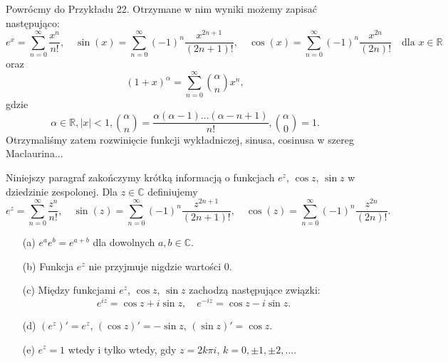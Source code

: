 \documentclass[leqno]{article}
\begin{document}
\begin{justify}
\begin{ex}
    Powrócmy do Przykładu 22. Otrzymane w nim wyniki możemy zapisać następująco:
    \[
        e^x = \sum_{n=0}^{\infty}\frac{x^n}{n!}, \quad
        \sin(x) = \sum_{n=0}^{\infty} {(-1)}^n \frac{x^{2n+1}}{(2n+1)!}, \quad
        \cos(x) = \sum_{n=0}^{\infty} {(-1)}^n \frac{x^{2n}}{(2n)!} \quad \text{dla } x \in \mathbb{R}
    \]
    oraz
    \[
        {(1 + x)}^\alpha = \sum_{n=0}^{\infty}\binom{\alpha}{n} x^n, 
    \]
    gdzie 
    \[
        \alpha \in \mathbb{R}, |x| < 1,
        \binom{\alpha}{n} = \frac{\alpha(\alpha - 1)\ldots(\alpha - n + 1)}{n!}, \binom{\alpha}{0} = 1.
    \]
    Otrzymaliśmy zatem rozwinięcie funkcji wykładniczej, sinusa, cosinusa w szereg Maclaurina...
\end{ex}

Niniejszy paragraf zakończymy krótką informacją o funkcjach $e^z$, $\cos z$, $\sin z$ w dziedzinie zespolonej.
Dla $z \in \mathbb{C}$ definiujemy 
\[
    e^z = \sum_{n=0}^{\infty}\frac{z^n}{n!}, \quad
    \sin(z) = \sum_{n=0}^{\infty} {(-1)}^n \frac{z^{2n+1}}{(2n+1)!}, \quad
    \cos(z) = \sum_{n=0}^{\infty} {(-1)}^n \frac{z^{2n}}{(2n)!}.
\]

\begin{theorem}
{
    \begin{itemize}
        \item [(a)]
            $e^a e^b = e^{a+b}$ dla dowolnych $a, b \in \mathbb{C}$.
        \item [(b)]
            Funkcja $e^z$ nie przyjmuje nigdzie wartości $0$.
        \item [(c)]
            Między funkcjami $e^z$, $\cos z$, $\sin z$ zachodzą następujące związki:
            \begin{equation}\label{eq:93}
                e^{iz} = \cos z + i \sin z, \quad e^{-iz} = \cos z - i \sin z.
            \end{equation}
        \item [(d)]
            $(e^z)' = e^z$, $(\cos z)' = -\sin z$, $(\sin z)' = \cos z$.
        \item [(e)]
            $e^z = 1$ wtedy i tylko wtedy, gdy $z = 2k\pi i$, $k = 0, \pm 1, \pm 2, \ldots$.
    \end{itemize}
}
\end{theorem}


\end{justify}
\end{document}
